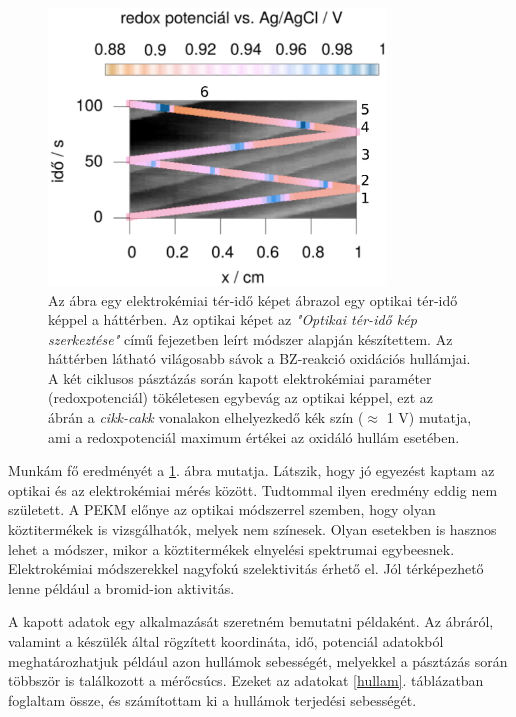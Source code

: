 \begin{figure}
\centering
\includegraphics[width=0.8\textwidth]{img/spacetime2.eps}
\caption{Az ábra egy elektrokémiai tér-idő képet ábrazol egy optikai tér-idő képpel a háttérben. Az optikai képet az \emph{"Optikai tér-idő kép szerkeztése"} című fejezetben leírt módszer alapján készítettem. Az háttérben látható világosabb sávok a BZ-reakció oxidációs hullámjai. A két ciklusos pásztázás során kapott elektrokémiai paraméter (redoxpotenciál) tökéletesen egybevág az optikai képpel, ezt az ábrán a \emph{cikk-cakk} vonalakon elhelyezkedő kék szín ($\approx$ 1 V) mutatja, ami a redoxpotenciál maximum értékei az oxidáló hullám esetében.}
\label{fig:spatiotemporal}
\end{figure}
Munkám fő eredményét a \ref{fig:spatiotemporal}. ábra mutatja. Látszik, hogy jó egyezést kaptam az optikai és az elektrokémiai mérés között. Tudtommal ilyen eredmény eddig nem született. A PEKM előnye az optikai módszerrel szemben, hogy olyan köztitermékek is vizsgálhatók, melyek nem színesek. Olyan esetekben is hasznos lehet a módszer, mikor a köztitermékek elnyelési spektrumai egybeesnek. Elektrokémiai módszerekkel nagyfokú szelektivitás érhető el. Jól térképezhető lenne például a bromid-ion aktivitás.

A kapott adatok egy alkalmazását szeretném bemutatni példaként. Az ábráról, valamint a készülék által rögzített koordináta, idő, potenciál adatokból meghatározhatjuk például azon hullámok sebességét, melyekkel a pásztázás során többször is találkozott a mérőcsúcs. Ezeket az adatokat \ref{hullam}. táblázatban foglaltam össze, és számítottam ki a hullámok terjedési sebességét.

